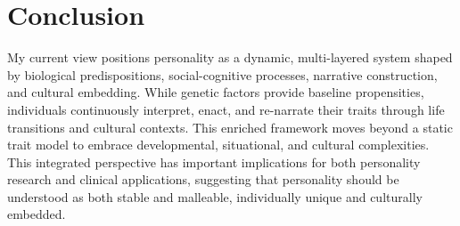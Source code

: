 \documentclass[stu]{apa7}
\begin{document}
\section{Conclusion}

My current view positions personality as a dynamic, multi-layered system shaped by biological predispositions, social-cognitive processes, narrative construction, and cultural embedding. While genetic factors provide baseline propensities, individuals continuously interpret, enact, and re-narrate their traits through life transitions and cultural contexts. This enriched framework moves beyond a static trait model to embrace developmental, situational, and cultural complexities. This integrated perspective has important implications for both personality research and clinical applications, suggesting that personality should be understood as both stable and malleable, individually unique and culturally embedded.


\printbibliography
\end{document}
